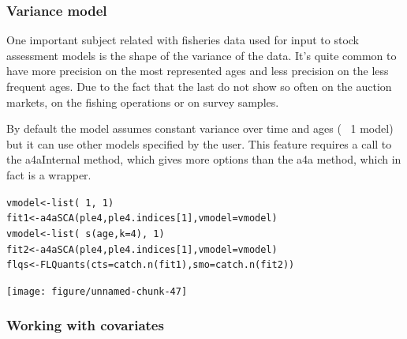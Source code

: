 \documentclass[a4paper,english,10pt]{article}\usepackage[]{graphicx}\usepackage[]{color}
\makeatletter
\newcommand{\hlnum}[1]{\textcolor[rgb]{0.2,0.2,0.2}{#1}}%
\newcommand{\hlopt}[1]{\textcolor[rgb]{0.2,0.2,0.2}{#1}}%
\newcommand{\hlstd}[1]{\textcolor[rgb]{0,0,0}{#1}}%
\newcommand{\hlkwb}[1]{\textcolor[rgb]{0.361,0.506,0.596}{#1}}%
\newcommand{\hlkwc}[1]{\textcolor[rgb]{0.361,0.506,0.596}{#1}}%
\newcommand{\hlkwd}[1]{\textcolor[rgb]{0.361,0.506,0.596}{#1}}%
\newenvironment{kframe}{%
 \def\at@end@of@kframe{}%
 \ifinner\ifhmode%
  \def\at@end@of@kframe{\end{minipage}}%
  \begin{minipage}{\columnwidth}%
 \fi\fi%
 \def\FrameCommand##1{\hskip\@totalleftmargin \hskip-\fboxsep
 \colorbox{shadecolor}{##1}\hskip-\fboxsep
     \hskip-\linewidth \hskip-\@totalleftmargin \hskip\columnwidth}%
 \MakeFramed {\advance\hsize-\width
   \@totalleftmargin\z@ \linewidth\hsize
   \@setminipage}}%
 {\par\unskip\endMakeFramed%
 \at@end@of@kframe}
\newenvironment{knitrout}{}{} %
\makeatother
\begin{document}
\subsubsection{Variance model}

One important subject related with fisheries data used for input to stock assessment models is the shape of the variance of the data. It's quite common to have more precision on the most represented ages and less precision on the less frequent ages. Due to the fact that the last do not show so often on the auction markets, on the fishing operations or on survey samples.

By default the model assumes constant variance over time and ages (~ 1 model) but it can use other models specified by the user. This feature requires a call to the a4aInternal method, which gives more options than the a4a method, which in fact is a wrapper.

\begin{knitrout}
\color{fgcolor}\begin{kframe}
\begin{alltt}
\hlstd{vmodel} \hlkwb{<-} \hlkwd{list}\hlstd{(}\hlopt{~}\hlnum{1}\hlstd{,} \hlopt{~}\hlnum{1}\hlstd{)}
\hlstd{fit1} \hlkwb{<-} \hlkwd{a4aSCA}\hlstd{(ple4, ple4.indices[}\hlnum{1}\hlstd{],} \hlkwc{vmodel} \hlstd{= vmodel)}
\hlstd{vmodel} \hlkwb{<-} \hlkwd{list}\hlstd{(}\hlopt{~}\hlkwd{s}\hlstd{(age,} \hlkwc{k} \hlstd{=} \hlnum{4}\hlstd{),} \hlopt{~}\hlnum{1}\hlstd{)}
\hlstd{fit2} \hlkwb{<-} \hlkwd{a4aSCA}\hlstd{(ple4, ple4.indices[}\hlnum{1}\hlstd{],} \hlkwc{vmodel} \hlstd{= vmodel)}
\hlstd{flqs} \hlkwb{<-} \hlkwd{FLQuants}\hlstd{(}\hlkwc{cts} \hlstd{=} \hlkwd{catch.n}\hlstd{(fit1),} \hlkwc{smo} \hlstd{=} \hlkwd{catch.n}\hlstd{(fit2))}
\end{alltt}
\end{kframe}
\end{knitrout}


\begin{knitrout}
\color{fgcolor}

{\centering \texttt{[image: figure/unnamed-chunk-47]} 

}



\end{knitrout}


\subsubsection{Working with covariates}
\end{document}
